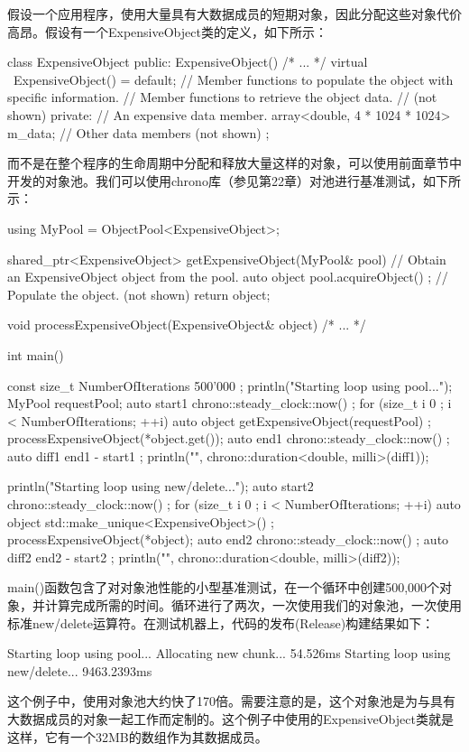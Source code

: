 
假设一个应用程序，使用大量具有大数据成员的短期对象，因此分配这些对象代价高昂。假设有一个ExpensiveObject类的定义，如下所示：

\begin{cpp}
class ExpensiveObject
{
    public:
        ExpensiveObject() { /* ... */ }
        virtual ~ExpensiveObject() = default;
        // Member functions to populate the object with specific information.
        // Member functions to retrieve the object data.
        // (not shown)
    private:
        // An expensive data member.
        array<double, 4 * 1024 * 1024> m_data;
        // Other data members (not shown)
};
\end{cpp}

而不是在整个程序的生命周期中分配和释放大量这样的对象，可以使用前面章节中开发的对象池。我们可以使用chrono库（参见第22章）对池进行基准测试，如下所示：

\begin{cpp}
using MyPool = ObjectPool<ExpensiveObject>;

shared_ptr<ExpensiveObject> getExpensiveObject(MyPool& pool)
{
    // Obtain an ExpensiveObject object from the pool.
    auto object { pool.acquireObject() };
    // Populate the object. (not shown)
    return object;
}

void processExpensiveObject(ExpensiveObject& object) { /* ... */ }

int main()
{
    const size_t NumberOfIterations { 500'000 };
    println("Starting loop using pool...");
    MyPool requestPool;
    auto start1 { chrono::steady_clock::now() };
    for (size_t i { 0 }; i < NumberOfIterations; ++i) {
        auto object { getExpensiveObject(requestPool) };
        processExpensiveObject(*object.get());
    }
    auto end1 { chrono::steady_clock::now() };
    auto diff1 { end1 - start1 };
    println("{}", chrono::duration<double, milli>(diff1));


    println("Starting loop using new/delete...");
    auto start2 { chrono::steady_clock::now() };
    for (size_t i { 0 }; i < NumberOfIterations; ++i) {
        auto object { std::make_unique<ExpensiveObject>() };
        processExpensiveObject(*object);
    }
    auto end2 { chrono::steady_clock::now() };
    auto diff2 { end2 - start2 };
    println("{}", chrono::duration<double, milli>(diff2));
}
\end{cpp}

main()函数包含了对对象池性能的小型基准测试，在一个循环中创建500,000个对象，并计算完成所需的时间。循环进行了两次，一次使用我们的对象池，一次使用标准new/delete运算符。在测试机器上，代码的发布(Release)构建结果如下：

\begin{shell}
Starting loop using pool...
Allocating new chunk...
54.526ms
Starting loop using new/delete...
9463.2393ms
\end{shell}

这个例子中，使用对象池大约快了170倍。需要注意的是，这个对象池是为与具有大数据成员的对象一起工作而定制的。这个例子中使用的ExpensiveObject类就是这样，它有一个32MB的数组作为其数据成员。

